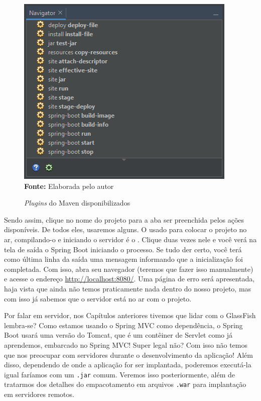 \FloatBarrier
\begin{figure}[!htbp]
    \centering
    \caption{\textit{Plugins} do Maven disponibilizados}
    \includegraphics[scale=1]{imagens/cap10PluginsMaven}
    \\\textbf{Fonte:} Elaborada pelo autor
    \label{fig:cap10PluginsMaven}
\end{figure}
\FloatBarrier

Sendo assim, clique no nome do projeto para a aba  ser preenchida pelos ações disponíveis. De todos eles, usaremos alguns. O usado para colocar o projeto no ar, compilando-o e iniciando o servidor é o . Clique duas vezes nele e você verá na tela de saída o Spring Boot iniciando o processo. Se tudo der certo, você terá como última linha da saída uma mensagem informando que a inicialização foi completada. Com isso, abra seu navegador (teremos que fazer isso manualmente) e acesse o endereço \url{http://localhost:8080/}. Uma página de erro será apresentada, haja vista que ainda não temos praticamente nada dentro do nosso projeto, mas com isso já sabemos que o servidor está no ar com o projeto.

Por falar em servidor, nos Capítulos anteriores tivemos que lidar com o GlassFish lembra-se? Como estamos usando o Spring MVC como dependência, o Spring Boot usará uma versão do Tomcat, que é um contêiner de Servlet como já aprendemos, embarcado no Spring MVC! Super legal não? Com isso não temos que nos preocupar com servidores durante o desenvolvimento da aplicação! Além disso, dependendo de onde a aplicação for ser implantada, poderemos executá-la igual faríamos com um \texttt{.jar} comum. Veremos isso posteriormente, além de tratarmos dos detalhes do empacotamento em arquivos \texttt{.war} para implantação em servidores remotos.

